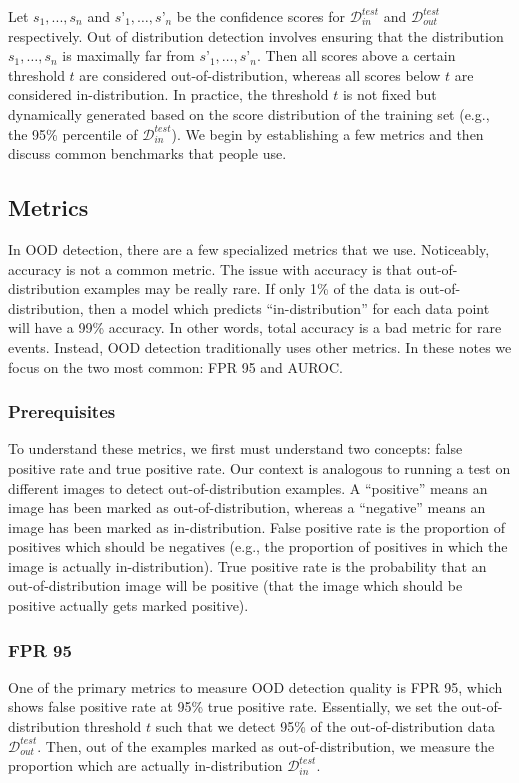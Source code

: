 \documentclass{article}
\newcommand{\D}{\mathcal{D}}
\begin{document}
Let $s_1, ..., s_n$ and $s’_1, …, s’_n$ be the confidence scores for $\D_{in}^{test}$ and $\D_{out}^{test}$ respectively. Out of distribution detection involves ensuring that the distribution $s_1, …, s_n$ is maximally far from $s’_1, …, s’_n$. Then all scores above a certain threshold $t$ are considered out-of-distribution, whereas all scores below $t$ are considered in-distribution. In practice, the threshold $t$ is not fixed but dynamically generated based on the score distribution of the training set (e.g., the 95\% percentile of $\D^{test}_{in}$). We begin by establishing a few metrics and then discuss common benchmarks that people use.

\subsection{Metrics}
In OOD detection, there are a few specialized metrics that we use. Noticeably, accuracy is not a common metric. The issue with accuracy is that out-of-distribution examples may be really rare. If only 1\% of the data is out-of-distribution, then a model which predicts ``in-distribution'' for each data point will have a 99\% accuracy. In other words, total accuracy is a bad metric for rare events. Instead, OOD detection traditionally uses other metrics. In these notes we focus on the two most common: FPR 95 and AUROC.

\subsubsection{Prerequisites}
To understand these metrics, we first must understand two concepts: false positive rate and true positive rate. Our context is analogous to running a test on different images to detect out-of-distribution examples. A ``positive'' means an image has been marked as out-of-distribution, whereas a ``negative'' means an image has been marked as in-distribution. False positive rate is the proportion of positives which should be negatives (e.g., the proportion of positives in which the image is actually in-distribution). True positive rate is the probability that an out-of-distribution image will be positive (that the image which should be positive actually gets marked positive).

\subsubsection{FPR 95}
One of the primary metrics to measure OOD detection quality is FPR 95, which shows false positive rate at 95\% true positive rate. Essentially, we set the out-of-distribution threshold $t$ such that we detect 95\% of the out-of-distribution data $\D_{out}^{test}$. Then, out of the examples marked as out-of-distribution, we measure the proportion which are actually in-distribution $\D_{in}^{test}$. 
\end{document}
